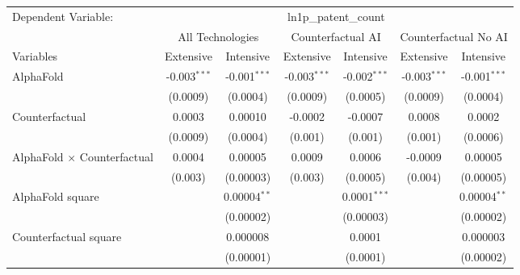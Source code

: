 \begingroup
\centering
\begin{tabular}{lcccccc}
   \tabularnewline \midrule \midrule
   Dependent Variable: & \multicolumn{6}{c}{ln1p\_patent\_count}\\
 & \multicolumn{2}{c}{All Technologies} & \multicolumn{2}{c}{Counterfactual AI} & \multicolumn{2}{c}{Counterfactual No AI} \\
\cmidrule(lr){1-1}\cmidrule(lr){2-3} \cmidrule(lr){4-5} \cmidrule(lr){6-7}
Variables & \multicolumn{1}{c}{Extensive} & \multicolumn{1}{c}{Intensive} & \multicolumn{1}{c}{Extensive} & \multicolumn{1}{c}{Intensive} & \multicolumn{1}{c}{Extensive} & \multicolumn{1}{c}{Intensive} \\
\cmidrule(lr){1-1}\cmidrule(lr){2-2} \cmidrule(lr){3-3} \cmidrule(lr){4-4} \cmidrule(lr){5-5} \cmidrule(lr){6-6} \cmidrule(lr){7-7}
   AlphaFold                          & -0.003$^{***}$ & -0.001$^{***}$     & -0.003$^{***}$ & -0.002$^{***}$ & -0.003$^{***}$ & -0.001$^{***}$\\   
                                      & (0.0009)       & (0.0004)           & (0.0009)       & (0.0005)       & (0.0009)       & (0.0004)\\   
   Counterfactual                     & 0.0003         & 0.00010            & -0.0002        & -0.0007        & 0.0008         & 0.0002\\   
                                      & (0.0009)       & (0.0004)           & (0.001)        & (0.001)        & (0.001)        & (0.0006)\\   
   AlphaFold $\times$ Counterfactual  & 0.0004         & 0.00005            & 0.0009         & 0.0006         & -0.0009        & 0.00005\\   
                                      & (0.003)        & (0.00003)          & (0.003)        & (0.0005)       & (0.004)        & (0.00005)\\   
   AlphaFold square                   &                & 0.00004$^{**}$     &                & 0.0001$^{***}$ &                & 0.00004$^{**}$\\   
                                      &                & (0.00002)          &                & (0.00003)      &                & (0.00002)\\   
   Counterfactual square              &                & 0.000008           &                & 0.0001         &                & 0.000003\\   
                                      &                & (0.00001)          &                & (0.0001)       &                & (0.00002)\\   

\end{tabular}
